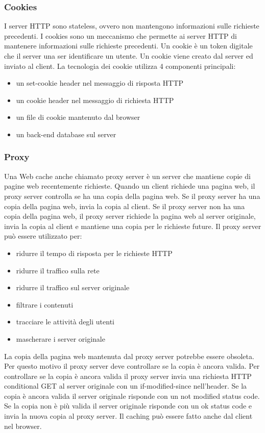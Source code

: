 \documentclass[12pt]{article}
\begin{document}
\subsubsection{Cookies}
I server HTTP sono stateless, ovvero non mantengono informazioni sulle richieste precedenti.
I cookies sono un meccanismo che permette ai server HTTP di mantenere informazioni sulle richieste precedenti.
Un cookie è un token digitale che il server una ser identificare un utente.
Un cookie viene creato dal server ed inviato al client.
La tecnologia dei cookie utilizza 4 componenti principali:
\begin{itemize}
    \item un set-cookie header nel messaggio di risposta HTTP
    \item un cookie header nel messaggio di richiesta HTTP
    \item un file di cookie mantenuto dal browser
    \item un back-end database sul server
\end{itemize}
\subsubsection{Proxy}
Una Web cache anche chiamato proxy server è un server che mantiene copie di pagine web recentemente richieste.
Quando un client richiede una pagina web, il proxy server controlla se ha una copia della pagina web.
Se il proxy server ha una copia della pagina web, invia la copia al client.
Se il proxy server non ha una copia della pagina web, il proxy server richiede la pagina web al server originale, invia la copia al client e mantiene una copia per le richieste future.
Il proxy server può essere utilizzato per:
\begin{itemize}
    \item ridurre il tempo di risposta per le richieste HTTP
    \item ridurre il traffico sulla rete
    \item ridurre il traffico sul server originale
    \item filtrare i contenuti
    \item tracciare le attività degli utenti 
    \item mascherare i server originale
\end{itemize}
La copia della pagina web mantenuta dal proxy server potrebbe essere obsoleta.
Per questo motivo il proxy server deve controllare se la copia è ancora valida.
Per controllare se la copia è ancora valida il proxy server invia una richiesta HTTP conditional GET al server originale con un if-modified-since nell'header.
Se la copia è ancora valida il server originale risponde con un not modified status code.
Se la copia non è più valida il server originale risponde con un ok status code e invia la nuova copia al proxy server.
Il caching può essere fatto anche dal client nel browser.
\end{document}
